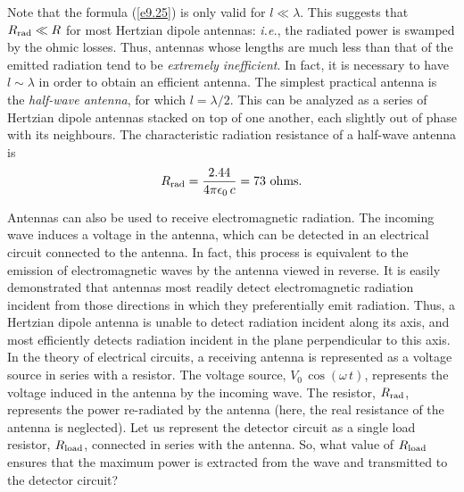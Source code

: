 Note that the formula (\ref{e9.25})  is only valid for $l\ll \lambda$. This suggests
that $R_{\rm rad} \ll R$ for most Hertzian 
dipole antennas: {\em i.e.}, the radiated power is
swamped by  the ohmic losses. Thus, antennas whose lengths are much less than
that of the emitted radiation tend to be {\em extremely inefficient}.
In fact,  it is necessary
to have $l\sim \lambda$ in order to obtain an efficient antenna. The simplest
practical antenna is the {\em half-wave antenna}, for which $l = \lambda/2$. This
can be analyzed as a series of Hertzian dipole antennas
 stacked on top of one another, each
slightly out of phase with its neighbours. The characteristic radiation resistance
of a half-wave antenna is
\begin{equation}
R_{\rm rad} = \frac{ 2.44}{4\pi\epsilon_0 \,c} = 73 \,\,{\rm ohms}.
\end{equation}

Antennas can also be used to receive electromagnetic radiation. The incoming wave
induces a voltage in the antenna, which can be detected in an electrical
 circuit
connected to the antenna. In fact, this process is equivalent to the emission
of electromagnetic waves by the antenna viewed in reverse. It
is easily demonstrated that antennas most readily detect electromagnetic radiation
incident from those directions in which they preferentially emit radiation. 
Thus, a Hertzian dipole antenna is unable to detect radiation incident along
its axis, and most efficiently detects radiation incident in the plane perpendicular
to this axis. In the theory of electrical circuits, a receiving antenna is represented
as a voltage source in series with a resistor. The voltage source, $V_0\,\cos(\omega \,t)$, represents
the voltage  induced in the antenna by the incoming wave. The resistor,
$R_{\rm rad}$, represents the power re-radiated by the antenna (here, 
the real resistance
of the antenna is neglected). Let us represent the detector circuit as a single
load resistor, $R_{\rm load}$, connected in series with the antenna. So, 
what value of $R_{\rm load}$  ensures that the maximum power is extracted from the
wave and transmitted to the detector circuit? 

